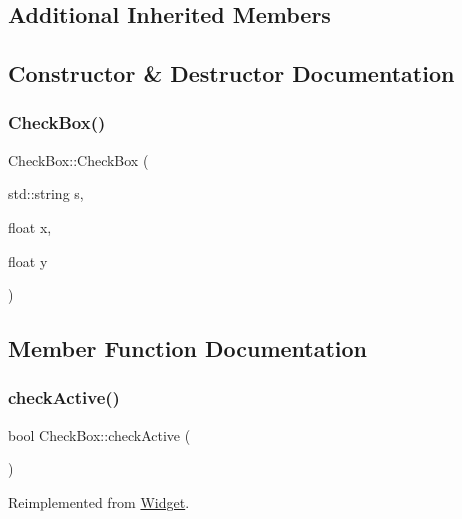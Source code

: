 \subsection*{Additional Inherited Members}


\subsection{Constructor \& Destructor Documentation}
\mbox{\label{class_check_box_a856f71f19447ffca4133c6ea05d605c9}} 
\subsubsection{\texorpdfstring{CheckBox()}{CheckBox()}}
{\footnotesize\ttfamily Check\+Box\+::\+Check\+Box (\begin{DoxyParamCaption}\item[{std\+::string}]{s,  }\item[{float}]{x,  }\item[{float}]{y }\end{DoxyParamCaption})}



\subsection{Member Function Documentation}
\mbox{\label{class_check_box_a7c03915fe705fd35e2d1934c00d2c3e8}} 
\subsubsection{\texorpdfstring{checkActive()}{checkActive()}}
{\footnotesize\ttfamily bool Check\+Box\+::check\+Active (\begin{DoxyParamCaption}{ }\end{DoxyParamCaption})\hspace{0.3cm}{\ttfamily [virtual]}}



Reimplemented from \mbox{\hyperlink{class_widget_ac87a7f54a06b9a2329884175f6a9c837}{Widget}}.

\mbox{\label{class_check_box_acc7a00bdaa6ee316e7622a52733be294}} 
